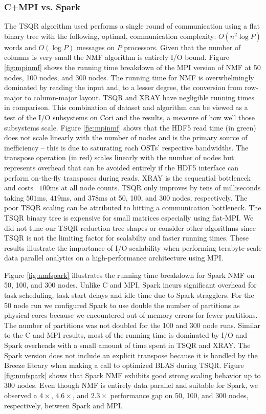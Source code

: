\subsubsection{C+MPI vs. Spark}
The TSQR algorithm used performs a single round of communication using a flat binary tree with the following, optimal, communication complexity: $O(n^2 \log P)$ words and $O(\log P)$ messages on $P$ processors. Given that the number of columns is very small the NMF algorithm is entirely I/O bound. Figure \ref{fig:mpinmf} shows the running time breakdown of the MPI version of NMF at 50 nodes, 100 nodes, and 300 nodes. The running time for NMF is overwhelmingly dominated by reading the input and, to a lesser degree, the conversion from row-major to column-major layout. TSQR and XRAY have negligible running times in comparison. This combination of dataset and algorithm can be viewed as a test of the I/O subsystems on Cori and the results, a measure of how well those subsystems scale. Figure \ref{fig:mpinmf} shows that the HDF5 read time (in green) does not scale linearly with the number of nodes and is the primary source of inefficiency -- this is due to saturating each OSTs' respective bandwidths. The transpose operation (in red) scales linearly with the number of nodes but represents overhead that can be avoided entirely if the HDF5 interface can perform on-the-fly transposes during reads. XRAY is the sequential bottleneck and costs ~$100$ms at all node counts. TSQR only improves by tens of milliseconds taking $501$ms, $419$ms, and $378$ms at 50, 100, and 300 nodes, respectively. The poor TSQR scaling can be attributed to hitting a communication bottleneck. The TSQR  binary tree is expensive for small matrices especially using flat-MPI. We did not tune our TSQR reduction tree shapes or consider other algorithms since TSQR is not the limiting factor for scalabilty and faster running times. These results illustrate the importance of I/O scalability when performing terabyte-scale data parallel analytics on a high-performance architecture using MPI.

Figure \ref{fig:nmfspark} illustrates the running time breakdown for Spark NMF on 50, 100, and 300 nodes. Unlike C and MPI, Spark incurs significant overhead for task scheduling, task start delays and idle time due to Spark stragglers. For the 50 node run we configured Spark to use double the number of partitions as physical cores because we encountered out-of-memory errors for fewer partitions. The number of partitions was not doubled for the 100 and 300 node runs. Similar to the C and MPI results, most of the running time is dominated by I/O and Spark overheads with a small amount of time spent in TSQR and XRAY. The Spark version does not include an explicit transpose because it is handled by the Breeze library when making a call to optimized BLAS during TSQR. Figure \ref{fig:nmfspark} shows that Spark NMF exhibits good strong scaling behavior up to 300 nodes.  Even though NMF is entirely data parallel and suitable for Spark, we observed a $4\times$, $4.6\times$, and $2.3\times$ performance gap on 50, 100, and 300 nodes, respectively, between Spark and MPI.

